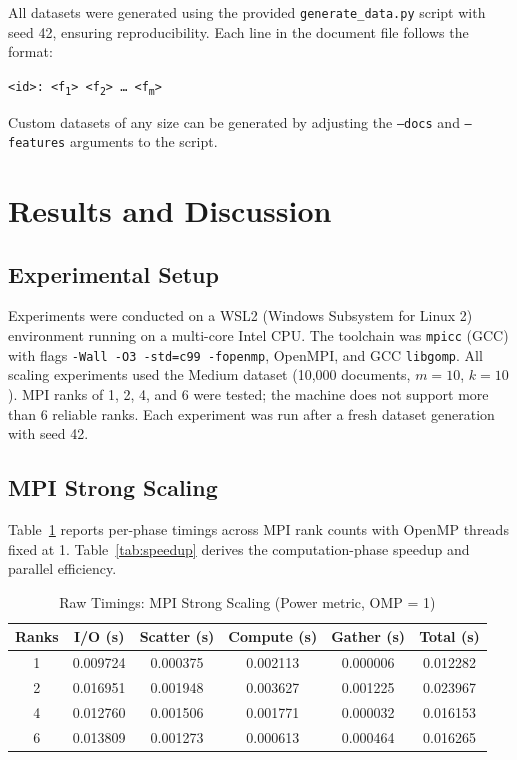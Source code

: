 \documentclass[12pt,a4paper]{article}
\begin{document}
All datasets were generated using the provided \texttt{generate\_data.py}
script with seed 42, ensuring reproducibility. Each line in the document
file follows the format:
\begin{center}
\texttt{<id>: <f\textsubscript{1}> <f\textsubscript{2}> \ldots\ <f\textsubscript{m}>}
\end{center}
Custom datasets of any size can be generated by adjusting the
\texttt{--docs} and \texttt{--features} arguments to the script.

\clearpage
\section{Results and Discussion}

\subsection{Experimental Setup}

Experiments were conducted on a WSL2 (Windows Subsystem for Linux 2)
environment running on a multi-core Intel CPU. The toolchain was
\texttt{mpicc} (GCC) with flags \texttt{-Wall -O3 -std=c99 -fopenmp},
OpenMPI, and GCC \texttt{libgomp}. All scaling experiments used the
Medium dataset (10,000 documents, $m=10$, $k=10$). MPI ranks of 1, 2,
4, and 6 were tested; the machine does not support more than 6 reliable
ranks. Each experiment was run after a fresh dataset generation with
seed 42.

\subsection{MPI Strong Scaling}
\label{sec:mpi}

Table~\ref{tab:scaling} reports per-phase timings across MPI rank counts
with OpenMP threads fixed at 1. Table~\ref{tab:speedup} derives the
computation-phase speedup and parallel efficiency.

\begin{table}[!htbp]
\centering
\small
\caption{Raw Timings: MPI Strong Scaling (Power metric, OMP = 1)}
\label{tab:scaling}
\renewcommand{\arraystretch}{1.3}
\begin{tabular}{|c|c|c|c|c|c|}
\hline
\textbf{Ranks} & \textbf{I/O (s)} & \textbf{Scatter (s)} &
\textbf{Compute (s)} & \textbf{Gather (s)} & \textbf{Total (s)} \\
\hline
1 & 0.009724 & 0.000375 & 0.002113 & 0.000006 & 0.012282 \\
2 & 0.016951 & 0.001948 & 0.003627 & 0.001225 & 0.023967 \\
4 & 0.012760 & 0.001506 & 0.001771 & 0.000032 & 0.016153 \\
6 & 0.013809 & 0.001273 & 0.000613 & 0.000464 & 0.016265 \\
\hline
\end{tabular}
\end{table}
\end{document}
